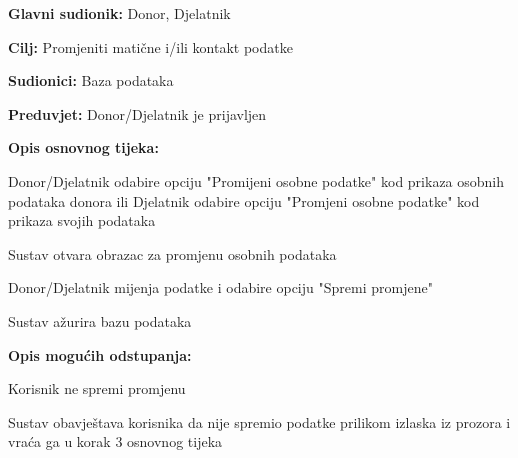 					\begin{packed_item}
	
						\item \textbf{Glavni sudionik: }Donor, Djelatnik
						\item \textbf{Cilj:} Promjeniti matične i/ili kontakt podatke
						\item \textbf{Sudionici:} Baza podataka
						\item \textbf{Preduvjet:} Donor/Djelatnik je prijavljen
						\item \textbf{Opis osnovnog tijeka:}
						
						\item[] \begin{packed_enum}
	
							\item Donor/Djelatnik odabire opciju "Promijeni osobne podatke" kod prikaza osobnih podataka donora ili Djelatnik odabire opciju "Promjeni osobne podatke" kod prikaza svojih podataka
							\item Sustav otvara obrazac za promjenu osobnih podataka
							\item Donor/Djelatnik mijenja podatke i odabire opciju "Spremi promjene"
							
							\item Sustav ažurira bazu podataka
							
						\end{packed_enum}

						\item  \textbf{Opis mogućih odstupanja:}
						
						\item[] \begin{packed_item}
	
							\item[3.a] Korisnik ne spremi promjenu
							\item[] \begin{packed_enum}
								
								\item  Sustav obavještava korisnika da nije spremio podatke prilikom izlaska iz prozora i vraća ga u korak 3 osnovnog tijeka
							 

								
									\end{packed_enum}
								\end{packed_item}
					\end{packed_item}
\noindent {}
